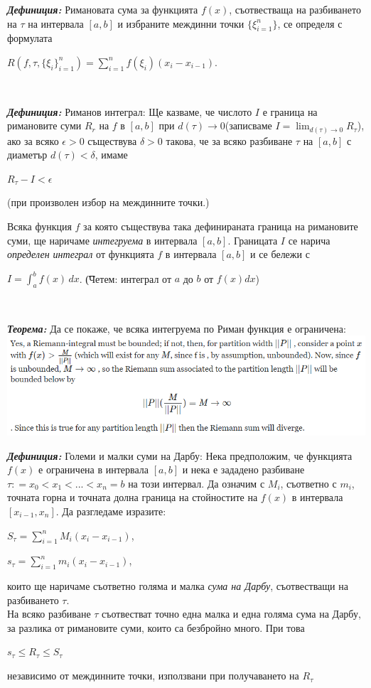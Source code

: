 \documentclass[11pt]{article} %
\newcommand{\italicBold}[1]{\textbf{\emph{#1}}}
\newcommand{\definition}{\italicBold{Дефиниция: }}
\newcommand{\theorem}{\italicBold{Теорема: }}
\newcommand{\integral}[4]{\displaystyle \int_{#1}^{#2}#3\,#4}
\newcommand{\curlies}[1]{\{#1\}}
\begin{document}
\definition Римановата сума за функцията $f(x)$, съотвестваща на разбиването на $\tau$ на интервала $[a,b]$ и избраните междинни точки $\curlies{\xi^{n}_{i=1}}$, се определя с формулата\\
\centerline{$R(f,\tau,\curlies{\xi_{i}}^{n}_{i=1})=\displaystyle\sum_{i=1}^{n}f(\xi_{i})(x_{i}-x_{i-1})$.}\\\par

\definition Риманов интеграл: Ще казваме, че числото $I$ е граница на римановите суми $R_{r}$ на $f$ в $[a,b]$ при $d(\tau) \to 0$(записваме $I = \lim_{d(\tau)\to 0}R_{\tau}$), ако за всяко $\epsilon > 0$ съществува $\delta > 0$ такова, че за всяко разбиване $\tau$ на $[a,b]$ с диаметър $d(\tau)<\delta$, имаме \\
\centerline{$R_{\tau}-I < \epsilon$}
(при произволен избор на междинните точки.)\par
Всяка функция $f$ за която съществува така дефинираната граница на римановите суми, ще наричаме \textit{интегруема} в интервала $[a,b]$. Границата $I$ се нарича \textit{определен интеграл} от функцията $f$ в интервала $[a,b]$ и се бележи с \\
\centerline{$I = \integral{a}{b}{f(x)}{dx}$. \t (Четем: интеграл от $a$ до $b$ от $f(x)dx$)}\\\par

\theorem Да се покаже, че всяка интегруема по Риман функция е ограничена:\\
\includegraphics[scale=0.85]{RiemannBounded.png}

\definition Големи и малки суми на Дарбу: Нека предположим, че функцията $f(x)$ е ограничена в интервала $[a,b]$ и нека е зададено разбиване $\tau: = x_{0}<x_{1}<...<x_{n}=b$ на този интервал. Да означим с $M_{i}$, съответно с $m_{i}$, точната горна и точната долна граница на стойностите на $f(x)$ в интервала $[x_{i-1},x_{n}]$. Да разгледаме изразите:\\
\centerline{$S_{\tau} = \displaystyle \sum_{i=1}^{n}M_{i}(x_{i}-x_{i-1})$,}
\centerline{$s_{\tau} = \displaystyle \sum_{i=1}^{n}m_{i}(x_{i}-x_{i-1})$,}
които ще наричаме съответно голяма и малка \textit{сума на Дарбу}, съотвестващи на разбиването $\tau$.\\
На всяко разбиване $\tau$ съотвестват точно една малка и една голяма сума на Дарбу, за разлика от римановите суми, които са безбройно много. При това \\
\centerline{$s_{\tau}\leq R_{\tau}\leq S_{\tau}$}
независимо от междинните точки, използвани при получаването на $R_{\tau}$\\\par
\end{document}
